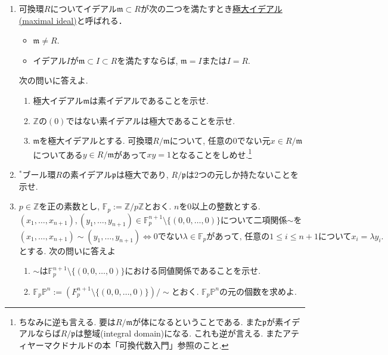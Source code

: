 \documentclass[dvipdfmx,a4paper,11pt]{article}
\newcommand{\Z}{\mathbb{Z}}
\theoremstyle{definition}
\begin{document}
\begin{enumerate}[label=\textbf{問}\ref*{sec-6}.\arabic*]
  
\item \label{3-maxi}
可換環$R$についてイデアル$\mathfrak{m}\subset R$が次の二つを満たすとき\underline{極大イデアル(maximal ideal)}と呼ばれる．
 \begin{itemize}
 \setlength{\parskip}{0cm}
  \setlength{\itemsep}{0pt}
  \item $\mathfrak{m} \neq R$.
    \item イデアル$I$が$\mathfrak{m} \subset I \subset R$を満たすならば, $\mathfrak{m}=I$または$I=R$.
\end{itemize}
次の問いに答えよ.
    \begin{enumerate}[label=(\arabic*).]
 \setlength{\parskip}{0cm}
  \setlength{\itemsep}{0pt}
\item 極大イデアル$\mathfrak{m}$は素イデアルであることを示せ.
\item $\Z$の$(0)$ではない素イデアルは極大であることを示せ. 
\item $\mathfrak{m}$を極大イデアルとする. 可換環$R/\mathfrak{m}$について, 任意の0でない元$x \in R/\mathfrak{m}$についてある$y \in R/\mathfrak{m}$があって$xy=1$となることをしめせ.\footnote{ちなみに逆も言える. 要は$R/\mathfrak{m}$が体になるということである. また$\mathfrak{p}$が素イデアルならば$R/\mathfrak{p}$は整域(integral domain)になる. これも逆が言える. またアティヤーマクドナルドの本「可換代数入門」参照のこと. }
\end{enumerate}

\item $^{*}$ブール環$R$の素イデアル$\mathfrak{p}$は極大であり, $R/\mathfrak{p}$は2つの元しか持たないことを示せ.

\item $p \in \Z$を正の素数とし, $\mathbb{F}_p :=\Z/p\Z $とおく.
$n$を0以上の整数とする. 
$(x_1, \ldots, x_{n+1}), (y_1, \ldots, y_{n+1}) \in \mathbb{F}_{p}^{n+1}\setminus \{ (0,0,\ldots, 0)\}$について二項関係$\sim$を
$$
(x_1, \ldots, x_{n+1}) \sim (y_1, \ldots, y_{n+1})  \Leftrightarrow \text{$0$でない$\lambda \in \mathbb{F}_p$があって, 任意の$1\le i \le n+1$について$x_i = \lambda y_i$.}
$$
とする.
次の問いに答えよ
    \begin{enumerate}[label=(\arabic*).]
 \setlength{\parskip}{0cm}
  \setlength{\itemsep}{0pt}
  \item $\sim$は$ \mathbb{F}_{p}^{n+1}\setminus \{ (0,0,\ldots, 0)\}$における同値関係であることを示せ.
  \item $\mathbb{F}_{p}\mathbb{P}^n:=(F_{p}^{n+1}\setminus \{ (0,0,\ldots, 0)\})/\sim$とおく. $\mathbb{F}_{p}\mathbb{P}^n$の元の個数を求めよ. 
  \end{enumerate}
  

\end{enumerate}
\end{document}
